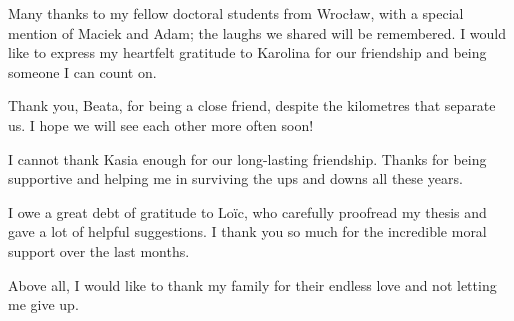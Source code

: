 \vspace{0.12cm}
\noindent Many thanks to my fellow doctoral students from Wrocław, with a special mention of Maciek and Adam; the laughs we shared will be remembered. I would like to express my heartfelt gratitude to Karolina for our friendship and being someone I can count on.

\vspace{0.12cm}
\noindent Thank you, Beata, for being a close friend, despite the kilometres that separate us. I hope we will see each other more often soon!

\vspace{0.12cm}
\noindent I cannot thank Kasia enough for our long-lasting friendship. Thanks for being supportive and helping me in surviving the ups and downs all these years.

\vspace{0.12cm}
\noindent I owe a great debt of gratitude to Lo\"ic, who carefully proofread my thesis and gave a lot of helpful suggestions. I thank you so much for the incredible moral support over the last months.

\vspace{0.12cm}
\noindent Above all, I would like to thank my family for their endless love and not letting me give up. 

\endgroup
